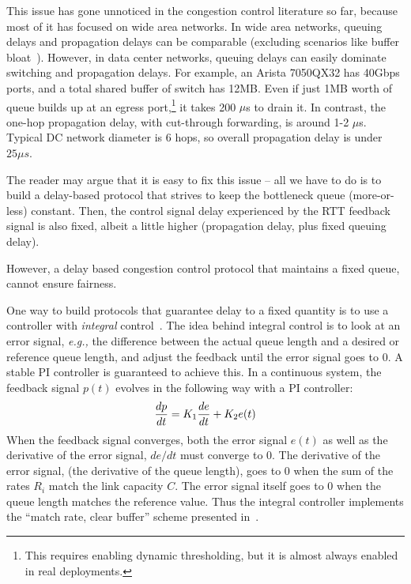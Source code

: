 This issue has gone unnoticed in the congestion control literature so far,
because most of it has focused on wide area networks.  In wide area networks,
queuing delays and propagation delays can be comparable (excluding scenarios
like buffer bloat~\cite{bufferbloat}). However, in data center networks, queuing
delays can easily dominate switching and propagation delays.  For example, an
Arista 7050QX32 has 40Gbps ports, and a total shared buffer of switch has 12MB.
Even if just 1MB worth of queue builds up at an egress port,\footnote{This
requires enabling dynamic thresholding, but it is almost always enabled in real
deployments.} it takes 200 $\mu$s to drain it. In contrast, the one-hop
propagation delay, with cut-through forwarding, is around 1-2 $\mu$s.  Typical
DC network diameter is 6 hops, so overall propagation delay is under $25\mu s$.

The reader may argue that it is easy to fix this issue  -- all we have to do is
to build a delay-based protocol that strives to keep the  bottleneck queue
(more-or-less) constant. Then, the control signal delay experienced by the RTT
feedback signal is also fixed, albeit a little higher (propagation delay, plus
fixed queuing delay). 

However, a delay based congestion control protocol that maintains a fixed
queue, cannot ensure fairness.

One way to build protocols that guarantee delay to a fixed quantity is to use
a controller with \emph{integral} control~\cite{hollot2001designing,REM}.  The idea behind integral control
is to look at an error signal, {\em e.g.,} the difference between the actual queue
length and a desired or reference queue length, and adjust the feedback until
the error signal goes to 0. A stable PI controller is guaranteed to achieve
this. In a continuous system, the feedback signal $p(t)$ evolves in the
following way with a PI controller:
\begin{equation}
\small
\frac{dp}{dt} = K_1 \frac{de}{dt}+K_2e(t)
\end{equation}
When the feedback signal converges, both the error signal $e(t)$ as
well as the derivative of the error signal, $de/dt$ must converge to
0. The derivative of the error signal, (the derivative of the queue length), goes to 0
when the sum of the rates $R_i$ match the link capacity $C$. The error signal itself goes to 0
when the queue length matches the reference value. Thus the integral
controller implements the ``match rate, clear buffer'' scheme
presented in~\cite{REM}. 

